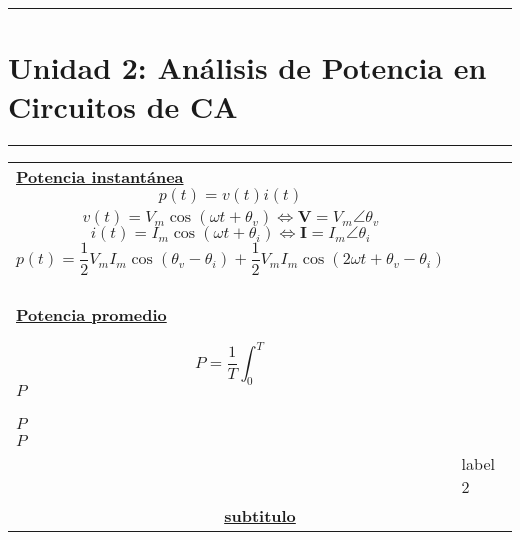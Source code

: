 \documentclass[../main.tex]{subfiles}
\begin{document}
\vspace{0.4in}
\hrule
\section{Unidad 2: Análisis de Potencia en Circuitos de CA}
\hrule
\vspace{0.1in}
\begin{tabularx}{\textwidth}{|X|X|}
  \hline
  \hline
  \underline{\textbf{Potencia instantánea}}
  $$p(t)=v(t)i(t)$$                                    \\
  $$v(t)=V_m\cos(\omega t +\theta_v) \Leftrightarrow \mathbf{V} =V_m\angle \theta_v$$
  $$i(t)=I_m\cos(\omega t +\theta_i) \Leftrightarrow \mathbf{I} =I_m\angle \theta_i$$
  $$p(t) = \frac{1}{2}V_mI_m\cos(\theta_v-\theta_i) +\frac{1}{2}V_mI_m\cos(2\omega t +\theta_v-\theta_i)$$
  \\\\
  \underline{\textbf{Potencia promedio}}

  $$P = \frac{1}{T}\int_0^T$$
  $P$                                                  \\
  $P$                                                  \\
  $P$                                                  \\
   &
  label 2
  \\

  \hline
  \multicolumn{2}{|c|}{\underline{\textbf{subtitulo}}} \\
  \hline
\end{tabularx}
\end{document}
